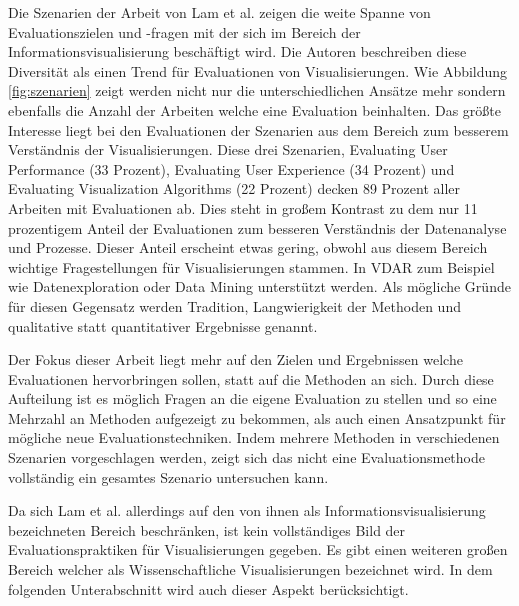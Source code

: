 \documentclass[draft=false
              ,paper=a4
              ,twoside=false
              ,fontsize=11pt
              ,headsepline
              ,BCOR10mm
              ,DIV11
              ]{scrbook}
\begin{document}
Die Szenarien der Arbeit von Lam et al. zeigen die weite Spanne von Evaluationszielen und -fragen mit der sich im Bereich der Informationsvisualisierung beschäftigt wird. Die Autoren beschreiben diese Diversität als einen Trend für Evaluationen von Visualisierungen. Wie Abbildung \ref{fig:szenarien} zeigt werden nicht nur die unterschiedlichen Ansätze mehr sondern ebenfalls die Anzahl der Arbeiten welche eine Evaluation beinhalten. Das größte Interesse liegt bei den Evaluationen der Szenarien aus dem Bereich zum besserem Verständnis der Visualisierungen. Diese drei Szenarien, Evaluating User Performance (33 Prozent), Evaluating User Experience (34 Prozent) und Evaluating Visualization Algorithms (22 Prozent) decken 89 Prozent aller Arbeiten mit Evaluationen ab. Dies steht in großem Kontrast zu dem nur 11 prozentigem Anteil der Evaluationen zum besseren Verständnis der Datenanalyse und Prozesse. Dieser Anteil erscheint etwas gering, obwohl aus diesem Bereich wichtige Fragestellungen für Visualisierungen stammen. In VDAR zum Beispiel wie Datenexploration oder Data Mining unterstützt werden. Als mögliche Gründe für diesen Gegensatz werden Tradition, Langwierigkeit der Methoden und qualitative statt quantitativer Ergebnisse genannt. 

Der Fokus dieser Arbeit liegt mehr auf den Zielen und Ergebnissen welche Evaluationen hervorbringen sollen, statt auf die Methoden an sich. Durch diese Aufteilung ist es möglich Fragen an die eigene Evaluation zu stellen und so eine Mehrzahl an Methoden aufgezeigt zu bekommen, als auch einen Ansatzpunkt für mögliche neue Evaluationstechniken. Indem mehrere Methoden in verschiedenen Szenarien vorgeschlagen werden, zeigt sich das nicht eine Evaluationsmethode vollständig ein gesamtes Szenario untersuchen kann. 

Da sich Lam et al. allerdings auf den von ihnen als Informationsvisualisierung bezeichneten Bereich beschränken, ist kein vollständiges Bild der Evaluationspraktiken für Visualisierungen gegeben. Es gibt einen weiteren großen Bereich welcher als Wissenschaftliche Visualisierungen bezeichnet wird. In dem folgenden Unterabschnitt wird auch dieser Aspekt berücksichtigt. 
\end{document}
